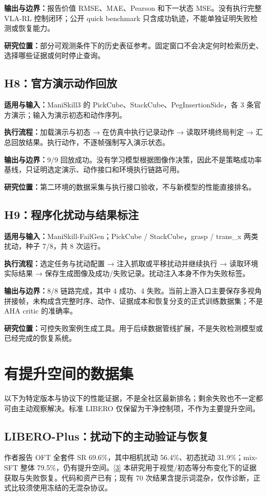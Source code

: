 \documentclass[UTF8,11pt,a4paper,fontset=none]{ctexart}
\begin{document}
\textbf{输出与边界：}报告价值 RMSE、MAE、Pearson 和下一状态 MSE。没有执行完整 VLA-RL 控制闭环；公开 quick benchmark 只含成功轨迹，不能单独证明失败检测或恢复能力。

\textbf{研究位置：}部分可观测条件下的历史表征参考。固定窗口不会决定何时检索历史、选择哪些证据或何时停止查询。

\subsection*{H8：官方演示动作回放}
\textbf{适用与输入：}ManiSkill3 的 PickCube、StackCube、PegInsertionSide，各 3 条官方演示；输入为演示初态和动作序列。

\textbf{执行流程：}加载演示与初态 → 在仿真中执行记录动作 → 读取环境终局判定 → 汇总回放结果。执行动作，不逐帧强制写入演示状态。

\textbf{输出与边界：}9/9 回放成功。没有学习模型根据图像作决策，因此不是策略成功率基线，只证明选定演示、动作接口和环境执行链路可用。

\textbf{研究位置：}第二环境的数据采集与执行接口验收，不与新模型的性能直接排名。

\subsection*{H9：程序化扰动与结果标注}
\textbf{适用与输入：}ManiSkill-FailGen；PickCube / StackCube，grasp / trans\_x 两类扰动，种子 7/8，共 8 次运行。

\textbf{执行流程：}选定任务与扰动配置 → 注入抓取或平移扰动并继续执行 → 读取环境实际结果 → 保存生成图像及成功/失败记录。扰动注入本身不作为失败标签。

\textbf{输出与边界：}8/8 链路完成，其中 4 成功、4 失败。当前上游入口主要保存多视角拼接帧，未构成含完整时序、动作、证据成本和恢复分支的正式训练数据集；不是 AHA critic 的准确率。

\textbf{研究位置：}可控失败案例生成工具。用于后续数据管线扩展，不是失败检测模型或已经完成的恢复系统。

\clearpage\section{有提升空间的数据集}
以下为特定版本与协议下的性能证据，不是全社区最新排名；剩余失败也不一定都可由主动观察解决。标准 LIBERO 仅保留为干净控制项，不作为主要提升空间。

\subsection{LIBERO-Plus：扰动下的主动验证与恢复}
作者报告 OFT 全套件 SR 69.6\%，其中相机扰动 56.4\%、初态扰动 31.9\%；mix-SFT 整体 79.5\%，仍有提升空间。\href{https://arxiv.org/pdf/2510.13626}{[3]} 本研究用于视觉/初态等分布变化下的证据获取与失败恢复。代码和资产已有；现有 70 次结果含提示词混杂，仅作诊断，正式比较须使用冻结的无混杂协议。
\end{document}
